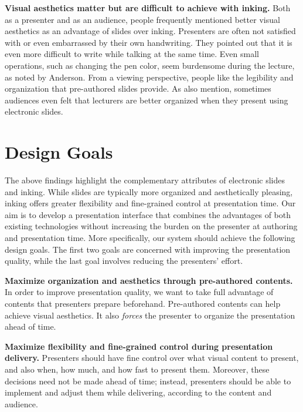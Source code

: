 \textbf{Visual aesthetics matter but are difficult to achieve with inking.} Both as a presenter and as an audience, people frequently mentioned better visual aesthetics as an advantage of slides over inking. Presenters are often not satisfied with or even embarrassed by their own handwriting. They pointed out that it is even more difficult to write while talking at the same time. Even small operations, such as changing the pen color, seem burdensome during the lecture, as noted by Anderson\cite{anderson2004study}. 
%
From a viewing perspective, people like the legibility and organization that pre-authored slides provide. As \cite{frey2002learners} also mention, sometimes audiences even felt that lecturers are better organized when they present using electronic slides. 

\section{Design Goals}

The above findings highlight the complementary attributes of electronic slides and inking. While slides are typically more organized and aesthetically pleasing, inking offers greater flexibility and fine-grained control at presentation time.
%
Our aim is to develop a presentation interface that combines the advantages of both existing technologies without increasing the burden on the presenter at authoring and presentation time.
%
More specifically, our system should achieve the following design goals. The first two goals are concerned with improving the presentation quality, while the last goal involves reducing the presenters' effort. 

\textbf{Maximize organization and aesthetics through pre-authored contents.} In order to improve presentation quality, we want to take full advantage of contents that presenters prepare beforehand. Pre-authored contents can help achieve visual aesthetics. It also \textit{forces} the presenter to organize the presentation ahead of time. 
 
\textbf{Maximize flexibility and fine-grained control during presentation delivery.} Presenters should have fine control over what visual content to present, and also when, how much, and how fast to present them. Moreover, these decisions need not be made ahead of time; instead, presenters should be able to implement and adjust them while delivering, according to the content and audience. 

